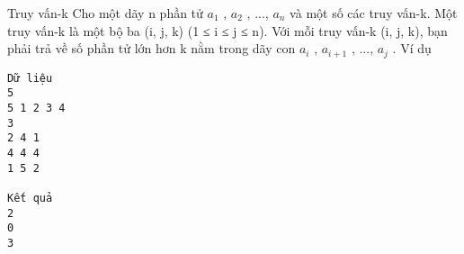 Truy vấn-k
Cho một dãy n phần tử $a_{1}$   ,   $a_{2}$   , ..., $a_{n}$   và một số các truy vấn-k. Một truy vấn-k là một bộ ba (i, j, k) (1 ≤ i ≤ j ≤ n). Với mỗi truy vấn-k (i, j, k), bạn phải trả về số phần tử lớn hơn k nằm trong dãy con $a_{i}$   ,   $a_{i+1}$   , ..., $a_{j}$   .
Ví dụ
\begin{verbatim}
Dữ liệu
5
5 1 2 3 4
3
2 4 1
4 4 4
1 5 2 

Kết quả
2
0
3 
\end{verbatim}